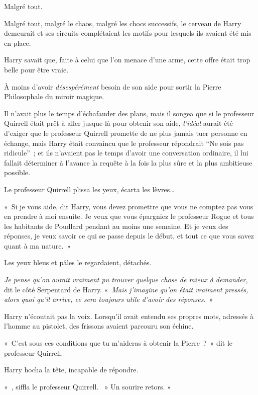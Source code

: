 \later

Malgré tout.

Malgré tout, malgré le chaos, malgré les chocs successifs, le cerveau de Harry demeurait et ses circuits complétaient les motifs pour lesquels ils avaient été mis en place.

Harry savait que, faite à celui que l'on menace d'une arme, cette offre était trop belle pour être vraie.

À moins d'avoir \emph{désespérément} besoin de son aide pour sortir la Pierre Philosophale du miroir magique.

Il n'avait plus le temps d'échafauder des plans, mais il songea que si le professeur Quirrell était prêt à aller jusque-là pour obtenir son aide, \emph{l'idéal} aurait été d'exiger que le professeur Quirrell promette de ne plus jamais tuer personne en échange, mais Harry était convaincu que le professeur répondrait “Ne sois pas ridicule”~; et ils n'avaient pas le temps d'avoir une conversation ordinaire, il lui fallait déterminer à l’avance la requête à la fois la plus sûre et la plus ambitieuse possible.

Le professeur Quirrell plissa les yeux, écarta les lèvres…

«~Si je vous aide, dit Harry, vous devez promettre que vous ne comptez pas vous en prendre à moi ensuite.
Je veux que vous épargniez le professeur Rogue et tous les habitants de Poudlard pendant au moins une semaine.
Et je veux des réponses, je veux savoir ce qui se passe depuis le début, et tout ce que vous savez quant à ma nature.~»

Les yeux bleus et pâles le regardaient, détachés.

\emph{Je pense qu'on aurait vraiment pu trouver quelque chose de mieux à demander}, dit le côté Serpentard de Harry.
«~\emph{Mais j'imagine qu'on était vraiment pressés, alors quoi qu'il arrive, ce sera toujours utile d'avoir des réponses.}~»

Harry n'écoutait pas la voix.
Lorsqu'il avait entendu ses propres mots, adressés à l'homme au pistolet, des frissons avaient parcouru son échine.

«~C'est sous ces conditions que tu m'aideras à obtenir la Pierre~?~»
dit le professeur Quirrell.

Harry hocha la tête, incapable de répondre.

«~, siffla le professeur Quirrell.
~» Un sourire retors.
«~

